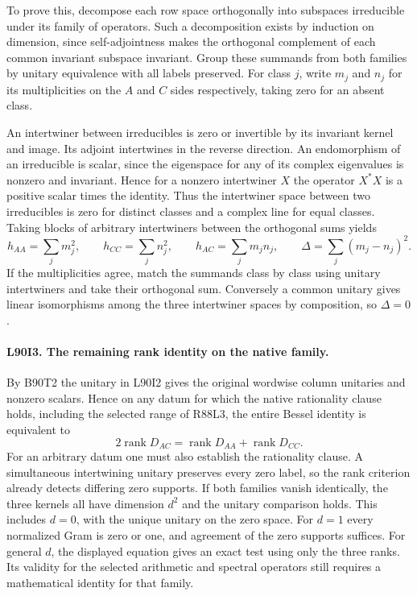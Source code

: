 To prove this, decompose each row space orthogonally into subspaces
irreducible under its family of operators. Such a decomposition
exists by induction on dimension, since self-adjointness makes the
orthogonal complement of each common invariant subspace invariant.
Group these summands from both families by unitary equivalence
with all labels preserved. For class $j$, write $m_j$ and $n_j$
for its multiplicities on the $A$ and $C$ sides respectively, taking
zero for an absent class.

An intertwiner between irreducibles is zero or invertible by its
invariant kernel and image. Its adjoint intertwines in the reverse
direction. An endomorphism of an irreducible is scalar, since the
eigenspace for any of its complex eigenvalues is nonzero and
invariant. Hence for a nonzero intertwiner $X$ the operator $X^*X$
is a positive scalar times the identity. Thus the intertwiner
space between two irreducibles is zero for distinct classes and a
complex line for equal classes. Taking blocks of arbitrary
intertwiners between the orthogonal sums yields
\[
 h_{AA}=\sum_j m_j^2,\qquad h_{CC}=\sum_j n_j^2,\qquad
 h_{AC}=\sum_j m_jn_j,\qquad
 \Delta=\sum_j(m_j-n_j)^2 .
\]
If the multiplicities agree, match the summands class by class
using unitary intertwiners and take their orthogonal sum. Conversely
a common unitary gives linear isomorphisms among the three
intertwiner spaces by composition, so $\Delta=0$.

\paragraph{L90I3. The remaining rank identity on the native family.}
By B90T2 the unitary in L90I2 gives the original wordwise column
unitaries and nonzero scalars. Hence on any datum for which the
native rationality clause holds, including the selected range of
R88L3, the entire Bessel identity is equivalent to
\[
      2\operatorname{rank}D_{AC}
           =\operatorname{rank}D_{AA}+\operatorname{rank}D_{CC}.
\]
For an arbitrary datum one must also establish the rationality
clause. A simultaneous intertwining unitary preserves every zero
label, so the rank criterion already detects differing zero
supports. If both families vanish identically, the three kernels
all have dimension $d^2$ and the unitary comparison holds. This includes
$d=0$, with the unique unitary on the zero space. For $d=1$ every
normalized Gram is zero or one, and agreement of the zero supports
suffices. For general $d$, the displayed equation gives an exact
test using only the three ranks. Its validity for the selected
arithmetic and spectral operators still requires a mathematical
identity for that family.
